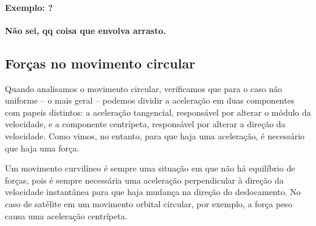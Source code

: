 \paragraph{Exemplo: ?}

\textbf{Não sei, qq coisa que envolva arrasto.}

\subsection{Forças no movimento circular}
   
Quando analisamos o movimento circular, verificamos que para o caso não uniforme -- o mais geral -- podemos dividir a aceleração em duas componentes com papeis distintos: a aceleração tangencial, responsável por alterar o módulo da velocidade, e a componente centrípeta, responsável por alterar a direção da velocidade. Como vimos, no entanto, para que haja uma aceleração, é necessário que haja uma força. 

\begin{marginfigure}
\centering
{}
\caption{Um movimento curvilíneo é sempre uma situação em que não há equilíbrio de forças, pois é sempre necessária uma aceleração perpendicular à direção da velocidade instantânea para que haja mudança na direção do deslocamento. No caso de satélite em um movimento orbital circular, por exemplo, a força peso causa uma aceleração centrípeta.}
\end{marginfigure}

